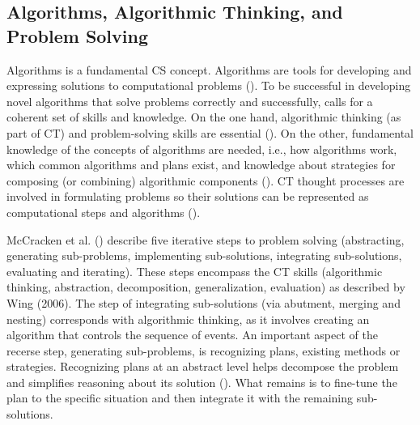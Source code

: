 



\subsection{Algorithms, Algorithmic Thinking, and Problem Solving}

Algorithms is a fundamental CS concept. Algorithms are tools for developing and expressing solutions to computational problems (\cite{GroverPea2013}). To be successful in developing novel algorithms that solve problems correctly and successfully, calls for a coherent set of skills and knowledge.
On the one hand, algorithmic thinking (as part of CT) and problem-solving skills are essential (\cite{McCracken2001}). On the other, fundamental knowledge of the concepts of algorithms are needed, i.e., how algorithms work, which common algorithms and plans exist, and knowledge about strategies for composing (or combining) algorithmic components (\cite{deRaadt2008}). CT thought processes are involved in formulating problems so their solutions can be represented as computational steps and algorithms (\cite{aho2012computation}).





McCracken et al. (\cite{McCracken2001}) describe five iterative steps to problem solving (abstracting, generating sub-problems, implementing sub-solutions, integrating sub-solutions, evaluating and iterating). These steps encompass the CT skills (algorithmic thinking, abstraction, decomposition, generalization, evaluation) as described by Wing (2006). The step of integrating sub-solutions (via abutment, merging and nesting) corresponds with algorithmic thinking, as it involves creating an algorithm that controls the sequence of events. An important aspect of the recerse step, generating sub-problems, is recognizing plans, existing methods or strategies. Recognizing plans at an abstract level helps decompose the problem and simplifies reasoning about its solution (\cite{Smetsers2017}). What remains is to fine-tune the plan to the specific situation and then integrate it with the remaining sub-solutions.


